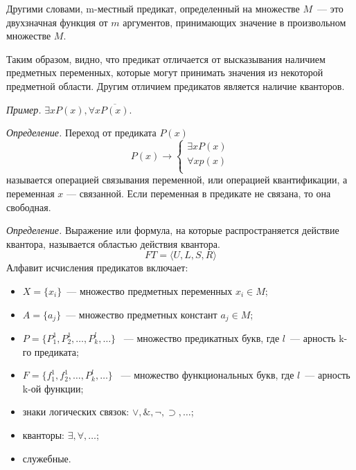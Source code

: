 \documentclass[a4paper,12pt]{report}
\begin{document}
	Другими словами, m-местный предикат, определенный на множестве $M$~--- это
	двухзначная функция от $m$ аргументов, принимающих значение в произвольном
	множестве $M$.

	Таким образом, видно, что предикат отличается от высказывания наличием
	предметных переменных, которые могут принимать значения из некоторой
	предметной области. Другим отличием предикатов является наличие кванторов.

	\textit{Пример.} $\exists x P(x), \forall x \overline{P(x)}$.

	\textit{Определение.} Переход от предиката $P(x)$
	$$ P(x) \rightarrow
	\begin{cases}
		\exists x P(x)\\
		\forall x p(x)\\
	\end{cases}$$
	называется операцией связывания переменной, или операцией квантификации, а
	переменная $x$ — связанной. Если переменная в предикате не связана, то она
	свободная.

	\textit{Определение.} Выражение или формула, на которые распространяется
	действие квантора, называется областью действия квантора.
	$$ FT = \langle U, L, S, R \rangle $$
	Алфавит исчисления предикатов включает:
	\begin{itemize}
		\item $X = \{x_i\}$~--- множество предметных переменных $x_i \in M$;
		\item $A = \{a_j\}$~--- множество предметных констант $a_j \in M$;
		\item $P = \{P^1_1, P^1_2,\dots,P^l_k,\dots\}$ ~--- множество предикатных
			букв, где $l$~--- арность k-го предиката;
		\item $F = \{f^1_1, f^1_2,\dots,P^l_k,\dots\}$ ~--- множество
			функциональных букв, где $l$~--- арность k-ой функции;
		\item знаки логических связок: $\vee, \&, \neg, \supset, \dots$;
		\item кванторы: $\exists, \forall, \dots$;
		\item служебные.
	\end{itemize}
\end{document}
